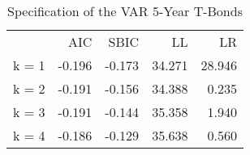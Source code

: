 \begin{table}[!h]
\caption{Specification of the VAR 5-Year T-Bonds}
\centering
\begin{tabular}{lllll}
\cline{1-5}
\multicolumn{1}{c}{} &
  \multicolumn{1}{|r}{AIC} &
  \multicolumn{1}{r}{SBIC} &
  \multicolumn{1}{r}{LL} &
  \multicolumn{1}{r}{LR} \\
\cline{1-5}
\multicolumn{1}{l}{k = 1} &
  \multicolumn{1}{|r}{-0.196} &
  \multicolumn{1}{r}{-0.173} &
  \multicolumn{1}{r}{34.271} &
  \multicolumn{1}{r}{28.946} \\
\multicolumn{1}{l}{k = 2} &
  \multicolumn{1}{|r}{-0.191} &
  \multicolumn{1}{r}{-0.156} &
  \multicolumn{1}{r}{34.388} &
  \multicolumn{1}{r}{0.235} \\
\multicolumn{1}{l}{k = 3} &
  \multicolumn{1}{|r}{-0.191} &
  \multicolumn{1}{r}{-0.144} &
  \multicolumn{1}{r}{35.358} &
  \multicolumn{1}{r}{1.940} \\
\multicolumn{1}{l}{k = 4} &
  \multicolumn{1}{|r}{-0.186} &
  \multicolumn{1}{r}{-0.129} &
  \multicolumn{1}{r}{35.638} &
  \multicolumn{1}{r}{0.560} \\
\cline{1-5}
\end{tabular}
\end{table}

